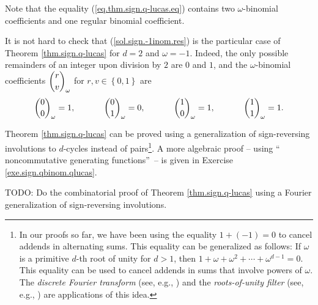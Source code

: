 Note that the equality (\ref{eq.thm.sign.q-lucas.eq}) contains two $\omega
$-binomial coefficients and one regular binomial coefficient.

It is not hard to check that (\ref{sol.sign.-1inom.res}) is the particular
case of Theorem \ref{thm.sign.q-lucas} for $d=2$ and $\omega=-1$. Indeed, the
only possible remainders of an integer upon division by $2$ are $0$ and $1$,
and the $\omega$-binomial coefficients $\dbinom{r}{v}_{\omega}$ for
$r,v\in\left\{  0,1\right\}  $ are%
\[
\dbinom{0}{0}_{\omega}=1,\ \ \ \ \ \ \ \ \ \ \dbinom{0}{1}_{\omega
}=0,\ \ \ \ \ \ \ \ \ \ \dbinom{1}{0}_{\omega}=1,\ \ \ \ \ \ \ \ \ \ \dbinom
{1}{1}_{\omega}=1.
\]


Theorem \ref{thm.sign.q-lucas} can be proved using a generalization of
sign-reversing involutions to $d$-cycles instead of pairs\footnote{In our
proofs so far, we have been using the equality $1+\left(  -1\right)  =0$ to
cancel addends in alternating sums. This equality can be generalized as
follows: If $\omega$ is a primitive $d$-th root of unity for $d>1$, then
$1+\omega+\omega^{2}+\cdots+\omega^{d-1}=0$. This equality can be used to
cancel addends in sums that involve powers of $\omega$. The \emph{discrete
Fourier transform} (see, e.g., \cite[\S 5.6]{OlvSha}) and the
\emph{roots-of-unity filter} (see, e.g., \cite[\S 1.2.9.D]{Knuth-TAoCP1}) are
applications of this idea.}. A more algebraic proof -- using \textquotedblleft
noncommutative generating functions\textquotedblright\ -- is given in Exercise
\ref{exe.sign.qbinom.qlucas}.

\begin{noncompile}
TODO: Do the combinatorial proof of Theorem \ref{thm.sign.q-lucas} using a
Fourier generalization of sign-reversing involutions.
\end{noncompile}
